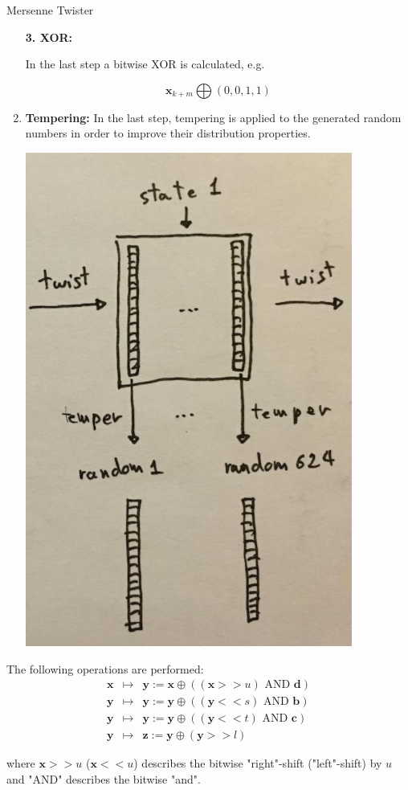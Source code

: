 \documentclass[11pt,compress,t,notes=noshow, xcolor=table]{beamer}
\begin{document}
\begin{vbframe}{Mersenne Twister}
\begin{enumerate}
\begin{footnotesize}
\lz

\textbf{3. XOR: }


In the last step a bitwise XOR is calculated, e.g.

$$
\mathbf{x}_{k + m} \bigoplus (0, 0, 1, 1)
$$
\end{footnotesize}

\framebreak

\item \textbf{Tempering:}  In the last step, tempering is applied to the generated random numbers in order to improve their distribution properties.

\vspace*{0.2cm}

\begin{center}
	\includegraphics[width = 0.3 \textwidth]{figure_man/temper.png}
\end{center}
\end{enumerate}

\framebreak

The following operations are performed:
\vspace*{-0.2cm}
\begin{eqnarray*}
\mathbf{x} &\mapsto& \mathbf{y} := \mathbf{x} \oplus ((\mathbf{x} >> u) \text{ AND } \mathbf{d}) \\ \mathbf{y} &\mapsto& \mathbf{y} := \mathbf{y} \oplus ((\mathbf{y} << s) \text{ AND } \mathbf{b}) \\
\mathbf{y} &\mapsto& \mathbf{y} := \mathbf{y} \oplus ((\mathbf{y} < < t) \text{ AND } \mathbf{c}) \\ \mathbf{y} &\mapsto& \mathbf{z} := \mathbf{y} \oplus (\mathbf{y} >> l)
\end{eqnarray*}

where $\mathbf{x} >> u$ ($\mathbf{x} << u$) describes the bitwise "right"-shift ("left"-shift) by $u$ and "AND" describes the bitwise "and".

\lz


\end{vbframe}
\end{document}
